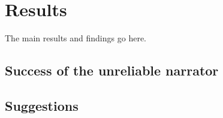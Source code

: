\section{Results}
The main results and findings go here.

\subsection{Success of the unreliable narrator}

\subsection{Suggestions}
